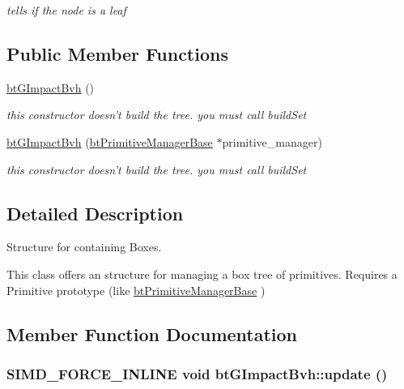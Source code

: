 \begin{CompactItemize}
\begin{CompactList}\small\item\em tells if the node is a leaf \item\end{CompactList}\end{CompactItemize}
\subsection*{Public Member Functions}
\begin{CompactItemize}
\item 
\hypertarget{classbt_g_impact_bvh_b305fcdbd3faf585e253433b7193587e}{
\hyperlink{classbt_g_impact_bvh_b305fcdbd3faf585e253433b7193587e}{btGImpactBvh} ()}
\label{classbt_g_impact_bvh_b305fcdbd3faf585e253433b7193587e}

\begin{CompactList}\small\item\em this constructor doesn't build the tree. you must call buildSet \item\end{CompactList}\item 
\hypertarget{classbt_g_impact_bvh_fbb8405cc5348fc66dc09819bfc60969}{
\hyperlink{classbt_g_impact_bvh_fbb8405cc5348fc66dc09819bfc60969}{btGImpactBvh} (\hyperlink{classbt_primitive_manager_base}{btPrimitiveManagerBase} $\ast$primitive\_\-manager)}
\label{classbt_g_impact_bvh_fbb8405cc5348fc66dc09819bfc60969}

\begin{CompactList}\small\item\em this constructor doesn't build the tree. you must call buildSet \item\end{CompactList}\end{CompactItemize}


\subsection{Detailed Description}
Structure for containing Boxes. 

This class offers an structure for managing a box tree of primitives. Requires a Primitive prototype (like \hyperlink{classbt_primitive_manager_base}{btPrimitiveManagerBase} ) 

\subsection{Member Function Documentation}
\hypertarget{classbt_g_impact_bvh_c0511b84c8722348fe4295b2a8f40c81}{
\subsubsection[update]{\setlength{\rightskip}{0pt plus 5cm}SIMD\_\-FORCE\_\-INLINE void btGImpactBvh::update ()}}
\label{classbt_g_impact_bvh_c0511b84c8722348fe4295b2a8f40c81}


